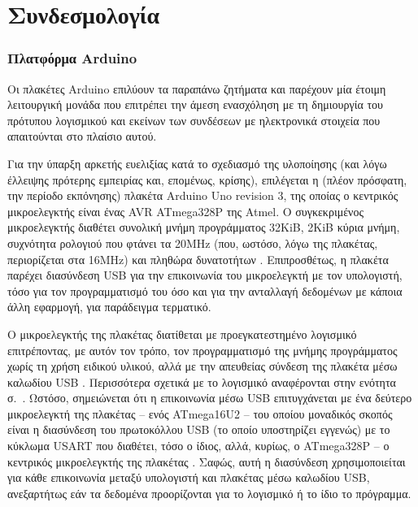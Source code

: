 \chapter{Συνδεσμολογία}








\subsection{Πλατφόρμα Arduino}
\label{subsec:arduino}

Οι πλακέτες Arduino επιλύουν τα παραπάνω ζητήματα και παρέχουν μία έτοιμη
λειτουργική μονάδα που επιτρέπει την άμεση ενασχόληση με τη δημιουργία του
πρότυπου λογισμικού και εκείνων των συνδέσεων με ηλεκτρονικά στοιχεία που
απαιτούνται στο πλαίσιο αυτού.

Για την ύπαρξη αρκετής ευελιξίας κατά το σχεδιασμό της υλοποίησης (και λόγω
έλλειψης πρότερης εμπειρίας και, επομένως, κρίσης), επιλέγεται η (πλέον
πρόσφατη, την περίοδο εκπόνησης) πλακέτα Arduino Uno revision 3, της οποίας ο
κεντρικός μικροελεγκτής είναι ένας AVR ATmega328P της Atmel. Ο συγκεκριμένος
μικροελεγκτής διαθέτει συνολική μνήμη προγράμματος 32KiB, 2KiB κύρια μνήμη,
συχνότητα ρολογιού που φτάνει τα 20MHz (που, ωστόσο, λόγω της πλακέτας,
περιορίζεται στα 16MHz) και πληθώρα δυνατοτήτων
\parencites[1]{atmel13}{arduino:uno}. Επιπροσθέτως, η πλακέτα παρέχει διασύνδεση
USB για την επικοινωνία του μικροελεγκτή με τον υπολογιστή, τόσο για τον
προγραμματισμό του όσο και για την ανταλλαγή δεδομένων με κάποια άλλη εφαρμογή,
για παράδειγμα τερματικό.

Ο μικροελεγκτής της πλακέτας  διατίθεται με
προεγκατεστημένο
λογισμικό  επιτρέποντας, με αυτόν τον τρόπο, τον προγραμματισμό
της μνήμης προγράμματος χωρίς τη χρήση ειδικού υλικού, αλλά με την απευθείας
σύνδεση της πλακέτα μέσω καλωδίου USB \parencite{arduino:environ}. Περισσότερα
σχετικά με το λογισμικό  αναφέρονται στην ενότητα
 σ.~\pageref{subsec:avr:progmem}.
Ωστόσο, σημειώνεται ότι η
επικοινωνία μέσω USB επιτυγχάνεται με ένα δεύτερο μικροελεγκτή της πλακέτας --
ενός ATmega16U2 -- του οποίου μοναδικός σκοπός είναι η διασύνδεση του
πρωτοκόλλου USB (το οποίο υποστηρίζει εγγενώς) με το κύκλωμα USART που διαθέτει,
τόσο ο ίδιος, αλλά, κυρίως, ο ATmega328P -- ο κεντρικός μικροελεγκτής της
πλακέτας \parencites{arduino:uno}[148,185]{atmel12}[172]{atmel13}. Σαφώς, αυτή η
διασύνδεση χρησιμοποιείται για κάθε επικοινωνία μεταξύ υπολογιστή και πλακέτας
μέσω καλωδίου USB, ανεξαρτήτως εάν τα δεδομένα προορίζονται για το λογισμικό
 ή το ίδιο το πρόγραμμα.

